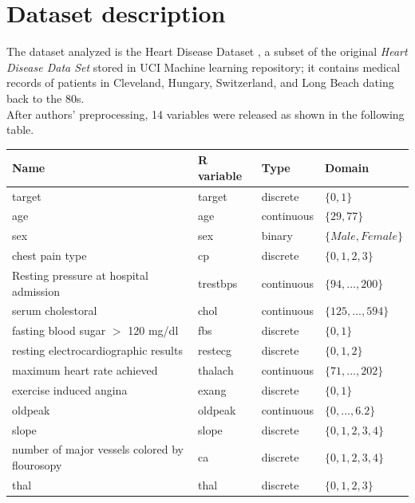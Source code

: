 \documentclass{article}
\begin{document}
\section{Dataset description}
The dataset analyzed is the Heart Disease Dataset \cite{dataset}, a subset of the original \textit{Heart Disease Data Set} stored in UCI Machine learning repository; it contains medical records of patients in Cleveland, Hungary, Switzerland, and Long Beach dating back to the 80s. \\
After authors' preprocessing, 14 variables were released as shown in the following table.

\begin{center}
\begin{tabularx}{1\textwidth} { 
  | >{\raggedright\arraybackslash}X 
  | >{\centering\arraybackslash}X 
  | >{\centering\arraybackslash}X 
  | >{\raggedleft\arraybackslash}X | }
 \hline
 Name & R variable & Type  & Domain \\
 \hline
 target  & target  & discrete  & $\{0,1\}$\\
\hline
 age  & age  & continuous  & $\{29,77\}$\\
\hline
 sex  & sex  & binary  & $\{Male,Female\}$\\
\hline
 chest pain type  & cp  & discrete  & $\{0,1,2,3\}$\\
 \hline
 Resting pressure at hospital admission  & trestbps  & continuous  & $\{94,...,200\}$\\
\hline
serum cholestoral  & chol  & continuous  & $ \{125,...,594 \}$\\
\hline
fasting blood sugar $>$ 120 mg/dl  & fbs  & discrete  & $\{0,1\}$\\
\hline
resting electrocardiographic results & restecg  & discrete  & $ \{0,1,2\}$  \\
\hline
maximum heart rate achieved & thalach & continuous  & $ \{71,...,202\}$  \\
\hline
 exercise induced angina & exang & discrete  & $\{0,1\}$  \\
\hline
oldpeak & oldpeak & continuous  & $\{0,...,6.2\}$  \\
\hline
slope & slope & discrete  & $\{0,1,2,3,4\}$  \\
\hline
number of major vessels colored by flourosopy & ca & discrete  & $\{0,1,2,3,4\}$  \\
\hline
thal & thal & discrete  & $\{0,1,2,3\}$  \\
\hline
\end{tabularx}
\end{center}
\end{document}
